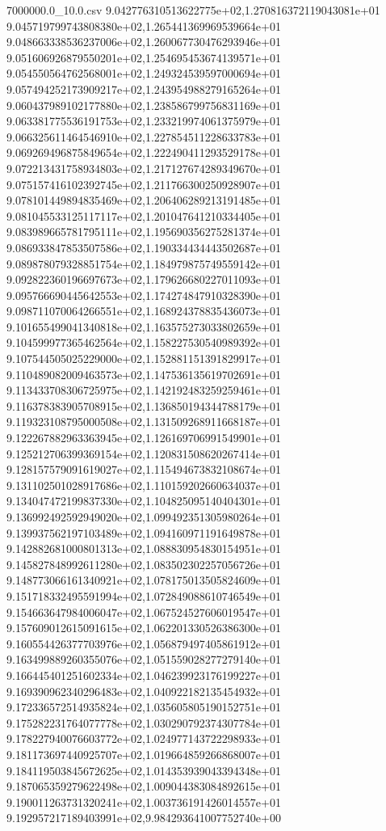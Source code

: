 \begin{filecontents*}{7000000.0_10.0.csv}
9.042776310513622775e+02,1.270816372119043081e+01
9.045719799743808380e+02,1.265441369969539664e+01
9.048663338536237006e+02,1.260067730476293946e+01
9.051606926879550201e+02,1.254695453674139571e+01
9.054550564762568001e+02,1.249324539597000694e+01
9.057494252173909217e+02,1.243954988279165264e+01
9.060437989102177880e+02,1.238586799756831169e+01
9.063381775536191753e+02,1.233219974061375979e+01
9.066325611464546910e+02,1.227854511228633783e+01
9.069269496875849654e+02,1.222490411293529178e+01
9.072213431758934803e+02,1.217127674289349670e+01
9.075157416102392745e+02,1.211766300250928907e+01
9.078101449894835469e+02,1.206406289213191485e+01
9.081045533125117117e+02,1.201047641210334405e+01
9.083989665781795111e+02,1.195690356275281374e+01
9.086933847853507586e+02,1.190334434443502687e+01
9.089878079328851754e+02,1.184979875749559142e+01
9.092822360196697673e+02,1.179626680227011093e+01
9.095766690445642553e+02,1.174274847910328390e+01
9.098711070064266551e+02,1.168924378835436073e+01
9.101655499041340818e+02,1.163575273033802659e+01
9.104599977365462564e+02,1.158227530540989392e+01
9.107544505025229000e+02,1.152881151391829917e+01
9.110489082009463573e+02,1.147536135619702691e+01
9.113433708306725975e+02,1.142192483259259461e+01
9.116378383905708915e+02,1.136850194344788179e+01
9.119323108795000508e+02,1.131509268911668187e+01
9.122267882963363945e+02,1.126169706991549901e+01
9.125212706399369154e+02,1.120831508620267414e+01
9.128157579091619027e+02,1.115494673832108674e+01
9.131102501028917686e+02,1.110159202660634037e+01
9.134047472199837330e+02,1.104825095140404301e+01
9.136992492592949020e+02,1.099492351305980264e+01
9.139937562197103489e+02,1.094160971191649878e+01
9.142882681000801313e+02,1.088830954830154951e+01
9.145827848992611280e+02,1.083502302257056726e+01
9.148773066161340921e+02,1.078175013505824609e+01
9.151718332495591994e+02,1.072849088610746549e+01
9.154663647984006047e+02,1.067524527606019547e+01
9.157609012615091615e+02,1.062201330526386300e+01
9.160554426377703976e+02,1.056879497405861912e+01
9.163499889260355076e+02,1.051559028277279140e+01
9.166445401251602334e+02,1.046239923176199227e+01
9.169390962340296483e+02,1.040922182135454932e+01
9.172336572514935824e+02,1.035605805190152751e+01
9.175282231764077778e+02,1.030290792374307784e+01
9.178227940076603772e+02,1.024977143722298933e+01
9.181173697440925707e+02,1.019664859266868007e+01
9.184119503845672625e+02,1.014353939043394348e+01
9.187065359279622498e+02,1.009044383084892615e+01
9.190011263731320241e+02,1.003736191426014557e+01
9.192957217189403991e+02,9.984293641007752740e+00

\end{filecontents*}

